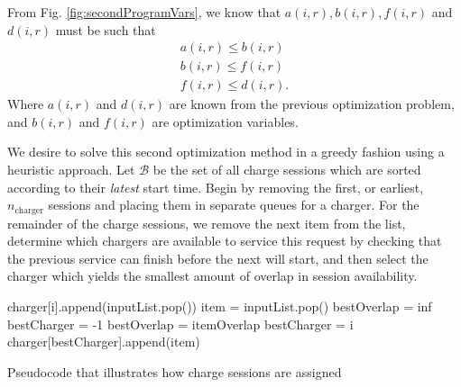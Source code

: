 \par From Fig. \ref{fig:secondProgramVars}, we know that $a(i,r), b(i,r),f(i,r)$ and $d(i,r)$ must be such that 
\begin{equation*}\begin{aligned}
	a(i,r) \le b(i,r) \\
	b(i,r) \le f(i,r) \\
	f(i,r) \le d(i,r). 	
\end{aligned}\end{equation*}
Where $a(i,r)$ and $d(i,r)$ are known from the previous optimization problem, and $b(i,r)$ and $f(i,r)$ are optimization variables.
\par We desire to solve this second optimization method in a greedy fashion using a heuristic approach. Let $\mathcal{B}$ be the set of all charge sessions which are sorted according to their {\it latest} start time.  Begin by removing the first, or earliest, $n_{\text{charger}}$ sessions and placing them in separate queues for a charger. For the remainder of the charge sessions, we remove the next item from the list, determine which chargers are available to service this request by checking that the previous service can finish before the next will start, and then select the charger which yields the smallest amount of overlap in session availability.
\begin{algorithm}[!ht]
\DontPrintSemicolon
{}
{
	charger[i].append(inputList.pop())
}
{
	item = inputList.pop()\;
	{
		bestOverlap = inf\;
		bestCharger = -1\;
		{
			{
				bestOverlap = itemOverlap\;
				bestCharger = i\;
			}
		}
	}
	charger[bestCharger].append(item)\;
}
\caption{Pseudocode that illustrates how charge sessions are assigned}
\label{alg:chargeAssign}
\end{algorithm}
